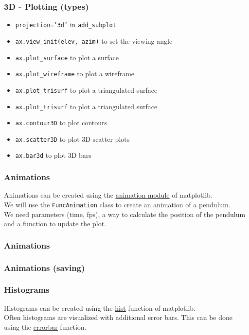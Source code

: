 \documentclass{beamer}
\newcommand{\hrefu}[2]{\underline{\href{#1}{#2}}}
\begin{document}
\begin{frame}
  \frametitle{3D - Plotting (types)}
  \begin{itemize}
    \item \texttt{projection='3d'} in \texttt{add\_subplot}
    \item \texttt{ax.view\_init(elev, azim)} to set the viewing angle
    \item \texttt{ax.plot\_surface} to plot a surface
    \item \texttt{ax.plot\_wireframe} to plot a wireframe
    \item \texttt{ax.plot\_trisurf} to plot a triangulated surface
    \item \texttt{ax.plot\_trisurf} to plot a triangulated surface
    \item \texttt{ax.contour3D} to plot contours
    \item \texttt{ax.scatter3D} to plot 3D scatter plots
    \item \texttt{ax.bar3d} to plot 3D bars
  \end{itemize}
\end{frame}

\begin{frame}
  \frametitle{Animations}
  Animations can be created using the \hrefu{https://matplotlib.org/stable/api/animation_api.html}{animation module} of matplotlib.\\
  \vspace{5mm}
  We will use the \texttt{FuncAnimation} class to create an animation of a pendulum.\\
  \vspace{5mm}
  We need parameters (time, fps), a way to calculate the position of the pendulum and a function to update the plot.\\
\end{frame}
\begin{frame}
  \frametitle{Animations}
  
\end{frame}
\begin{frame}
  \frametitle{Animations (saving)}
  
\end{frame}

\begin{frame}
  \frametitle{Histograms}
  Histograms can be created using the \hrefu{https://matplotlib.org/stable/api/_as_gen/matplotlib.pyplot.hist.html}{hist} function of matplotlib.\\
  \vspace{5mm}
  Often histograms are visualized with additional error bars. This can be done using the \hrefu{https://matplotlib.org/stable/api/_as_gen/matplotlib.pyplot.errorbar.html}{errorbar} function.\\
\end{frame}


\end{document}
